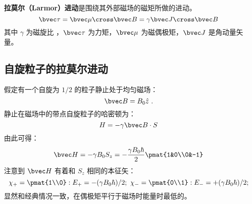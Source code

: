 \textbf{拉莫尔（Larmor）进动}是围绕其外部磁场的磁矩所做的进动。
\begin{equation}
\bvec \tau = \bvec\mu\cross\bvec B=\gamma\bvec J\cross \bvec B
\end{equation}
其中 $\gamma$ 为磁旋比 ，$\bvec\tau$ 为力矩，$\bvec \mu$ 为磁偶极矩，$\bvec J$ 是角动量矢量。

\subsection{自旋粒子的拉莫尔进动}

假定有一个自旋为 $1/2$ 的粒子静止处于均匀磁场：
\begin{equation}
\bvec B =B_0\hat{z}~.
\end{equation}
静止在磁场中的带点自旋粒子的哈密顿为：
\begin{equation}
H = -\gamma\bvec B\cdot S
\end{equation}
由此可得：
\begin{equation}
\bvec H = -\gamma B_0S_z=-\frac{\gamma B_0\hbar}{2}\pmat{1&0\\0&-1}
\end{equation}
注意到 $\bvec H$ 有着和 $S_z$ 相同的本征矢：
\begin{equation}
\chi_+ = \pmat{1\\0}:E_+=-(\gamma B_0\hbar)/2; \ \chi_- = \pmat{0\\1}:E_-=+(\gamma B_0\hbar)/2; 
\end{equation}
显然和经典情况一致，在偶极矩平行于磁场时能量时最低的。

